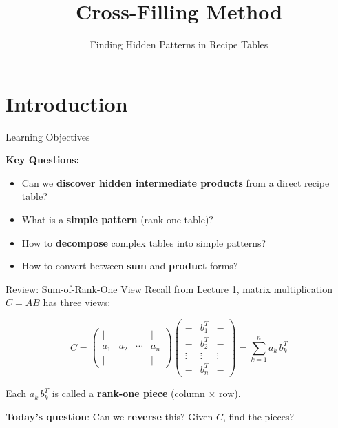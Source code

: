 \documentclass[10pt]{beamer}
\title{Cross-Filling Method}
\subtitle{Finding Hidden Patterns in Recipe Tables}
\date{}
\theoremstyle{definition}
\newcommand{\x}[1]{\alert{\textbf{#1}}}
\begin{document}
\maketitle

\section{Introduction}

\begin{frame}{Learning Objectives}

\vspace{0.5cm}
\textbf{Key Questions:}
\begin{itemize}
\item Can we \x{discover hidden intermediate products} from a direct recipe table?
\item What is a \x{simple pattern} (rank-one table)?
\item How to \x{decompose} complex tables into simple patterns?
\item How to convert between \x{sum} and \x{product} forms?
\end{itemize}
\end{frame}

\begin{frame}{Review: Sum-of-Rank-One View}
Recall from Lecture 1, matrix multiplication $C = AB$ has three views:

$$C =
\begin{pmatrix}
| & | & & | \\
a_1 & a_2 & \cdots & a_n \\
| & | & & |
\end{pmatrix}
\begin{pmatrix}
- & b_1^T & - \\
- & b_2^T & - \\
\vdots & \vdots & \vdots \\
- & b_n^T & -
\end{pmatrix}
= \sum_{k=1}^{n} a_k \, b_k^T$$

\vfill
Each $a_k \, b_k^T$ is called a \x{rank-one piece} (column $\times$ row).

\vfill
\textbf{Today's question}: Can we \x{reverse} this? Given $C$, find the pieces?
\end{frame}
\end{document}
